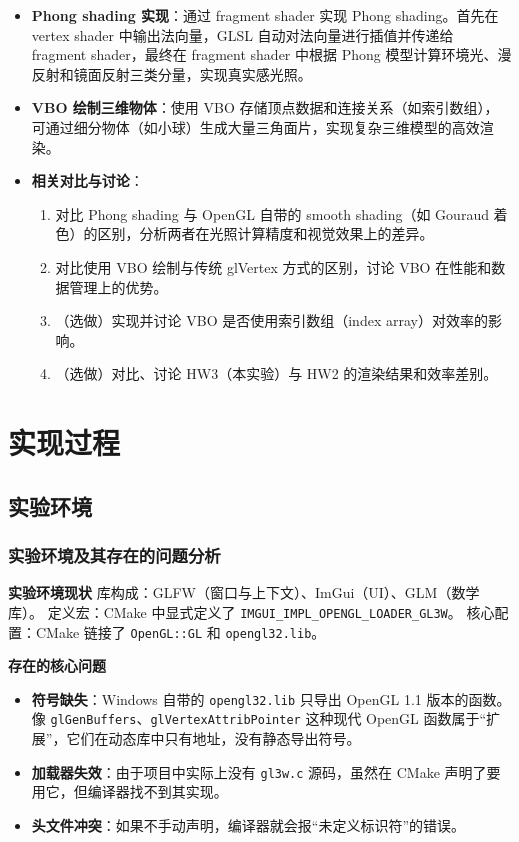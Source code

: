 \documentclass[a4paper]{article}
\begin{document}
\begin{itemize}
    \item \textbf{Phong shading 实现}：通过 fragment shader 实现 Phong shading。首先在 vertex shader 中输出法向量，GLSL 自动对法向量进行插值并传递给 fragment shader，最终在 fragment shader 中根据 Phong 模型计算环境光、漫反射和镜面反射三类分量，实现真实感光照。
    \item \textbf{VBO 绘制三维物体}：使用 VBO 存储顶点数据和连接关系（如索引数组），可通过细分物体（如小球）生成大量三角面片，实现复杂三维模型的高效渲染。
    \item \textbf{相关对比与讨论}：
    \begin{enumerate}
        \item 对比 Phong shading 与 OpenGL 自带的 smooth shading（如 Gouraud 着色）的区别，分析两者在光照计算精度和视觉效果上的差异。
        \item 对比使用 VBO 绘制与传统 glVertex 方式的区别，讨论 VBO 在性能和数据管理上的优势。
        \item （选做）实现并讨论 VBO 是否使用索引数组（index array）对效率的影响。
        \item （选做）对比、讨论 HW3（本实验）与 HW2 的渲染结果和效率差别。
    \end{enumerate}
\end{itemize}

\section{实现过程}
\subsection{实验环境}
\subsubsection{实验环境及其存在的问题分析}
\textbf{实验环境现状}
库构成：GLFW（窗口与上下文）、ImGui（UI）、GLM（数学库）。
定义宏：CMake 中显式定义了 \texttt{IMGUI\_IMPL\_OPENGL\_LOADER\_GL3W}。
核心配置：CMake 链接了 \texttt{OpenGL::GL} 和 \texttt{opengl32.lib}。

\textbf{存在的核心问题}
\begin{itemize}
    \item \textbf{符号缺失}：Windows 自带的 \texttt{opengl32.lib} 只导出 OpenGL 1.1 版本的函数。像 \texttt{glGenBuffers}、\texttt{glVertexAttribPointer} 这种现代 OpenGL 函数属于“扩展”，它们在动态库中只有地址，没有静态导出符号。
    \item \textbf{加载器失效}：由于项目中实际上没有 \texttt{gl3w.c} 源码，虽然在 CMake 声明了要用它，但编译器找不到其实现。
    \item \textbf{头文件冲突}：如果不手动声明，编译器就会报“未定义标识符”的错误。
\end{itemize}
\end{document}

